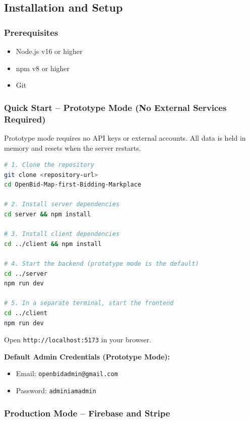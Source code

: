 \documentclass[11pt]{article}
\begin{document}
\subsection{Installation and Setup}

\subsubsection{Prerequisites}
\begin{itemize}[leftmargin=1.4em]
  \item Node.js v16 or higher
  \item npm v8 or higher
  \item Git
\end{itemize}

\subsubsection{Quick Start -- Prototype Mode (No External Services Required)}

Prototype mode requires no API keys or external accounts. All data is held in memory
and resets when the server restarts.

\begin{lstlisting}[language=bash]
# 1. Clone the repository
git clone <repository-url>
cd OpenBid-Map-first-Bidding-Markplace

# 2. Install server dependencies
cd server && npm install

# 3. Install client dependencies
cd ../client && npm install

# 4. Start the backend (prototype mode is the default)
cd ../server
npm run dev

# 5. In a separate terminal, start the frontend
cd ../client
npm run dev
\end{lstlisting}

Open \texttt{http://localhost:5173} in your browser.

\textbf{Default Admin Credentials (Prototype Mode):}
\begin{itemize}[leftmargin=1.4em]
  \item Email: \texttt{openbidadmin@gmail.com}
  \item Password: \texttt{adminiamadmin}
\end{itemize}

\subsubsection{Production Mode -- Firebase and Stripe}
\end{document}
